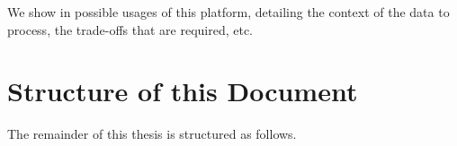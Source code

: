 We show in  possible usages of this platform, detailing the context of the data to process, the trade-offs that are required, etc.





\section{Structure of this Document}
\label{sec:Intro_StructureOfThisDocument}
The remainder of this thesis is structured as follows.

